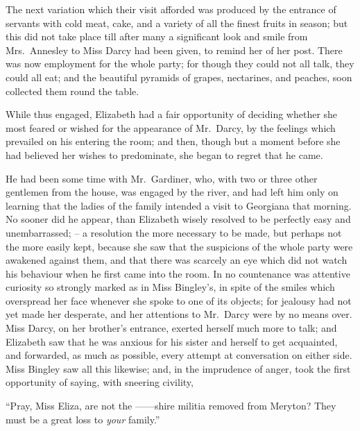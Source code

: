 The next variation which their visit afforded was produced
by the entrance of servants with cold meat, cake,
and a variety of all the finest fruits in season; but this
did not take place till after many a significant look and
smile from Mrs.\ Annesley to Miss Darcy had been given,
to remind her of her post. There was now employment
for the whole party; for though they could not all talk,
they could all eat; and the beautiful pyramids of grapes,
nectarines, and peaches, soon collected them round the
table.

While thus engaged, Elizabeth had a fair opportunity
of deciding whether she most feared or wished for the
appearance of Mr.\ Darcy, by the feelings which prevailed
on his entering the room; and then, though but a moment
before she had believed her wishes to predominate, she
began to regret that he came.

He had been some time with Mr.\ Gardiner, who, with
two or three other gentlemen from the house, was engaged
by the river, and had left him only on learning that the
ladies of the family intended a visit to Georgiana that
morning. No sooner did he appear, than Elizabeth wisely
resolved to be perfectly easy and unembarrassed; --
a resolution the more necessary to be made, but perhaps
not the more easily kept, because she saw that the suspicions
of the whole party were awakened against them,
and that there was scarcely an eye which did not watch
his behaviour when he first came into the room. In no
countenance was attentive curiosity so strongly marked
as in Miss Bingley’s, in spite of the smiles which overspread
her face whenever she spoke to one of its objects; for
jealousy had not yet made her desperate, and her attentions
to Mr.\ Darcy were by no means over. Miss Darcy,
on her brother’s entrance, exerted herself much more to
talk; and Elizabeth saw that he was anxious for his
sister and herself to get acquainted, and forwarded, as
much as possible, every attempt at conversation on either
side. Miss Bingley saw all this likewise; and, in the
imprudence of anger, took the first opportunity of saying,
with sneering civility,

“Pray, Miss Eliza, are not the \hbox{------shire} militia removed
from Meryton? They must be a great loss to \textit{your}
family.”

